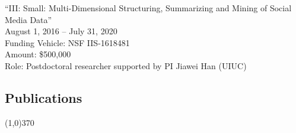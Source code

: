 \documentclass[10pt]{article}
\newenvironment{myindentpar}[1]%
{\begin{list}{}%
         {\setlength{\leftmargin}{#1}}%
         \item[]%
}
{\end{list}}
\newcounter{list}
\begin{document}
\begin{myindentpar}{0.75cm}
\hspace{-0.75cm}``III: Small: Multi-Dimensional Structuring, Summarizing and Mining of Social Media Data''\\
August 1, 2016 -- July 31, 2020 \\
Funding Vehicle: NSF IIS-1618481 \\
Amount: \$500,000 \\
Role: Postdoctoral researcher supported by PI Jiawei Han (UIUC)

\end{myindentpar}

\newpage

\vspace{-0.6cm}
\subsection{}
\subsection{\sc Publications}
\vspace{-0.4cm} \line(1,0){370} \vspace{-0.1cm}
\end{document}
